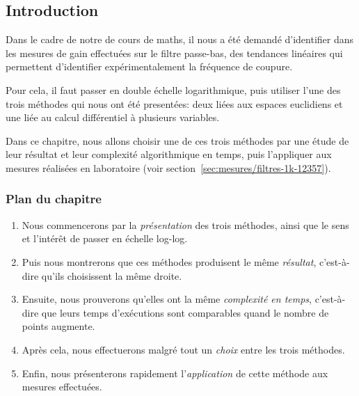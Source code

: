\subsection*{Introduction}

Dans le cadre de notre de cours de maths,
il nous a été demandé d'identifier dans les mesures de gain effectuées
sur le filtre passe-bas,
des tendances linéaires qui permettent d'identifier expérimentalement
la fréquence de coupure.

Pour cela, il faut passer en double échelle logarithmique,
puis utiliser l'une des trois méthodes qui nous ont été presentées:
deux liées aux espaces euclidiens et une liée au calcul différentiel
à plusieurs variables.

Dans ce chapitre, nous allons choisir une de ces trois méthodes
par une étude de leur résultat et leur complexité algorithmique en temps,
puis l'appliquer aux mesures réalisées en laboratoire
(voir section~\ref{sec:mesures/filtres-1k-12357}).

\subsubsection*{Plan du chapitre}
\begin{enumerate}
    \item Nous commencerons par la \emph{présentation} des trois méthodes,
        ainsi que le sens et l'intérêt de passer en échelle log-log.
    \item Puis nous montrerons que ces méthodes produisent
        le même \emph{résultat},
        c'est-à-dire qu'ils choisissent la même droite.
    \item Ensuite, nous prouverons qu'elles ont la même \emph{complexité
        en temps}, c'est-à-dire que leurs temps d'exécutions sont comparables
        quand le nombre de points augmente.
    \item Après cela, nous effectuerons malgré tout un \emph{choix}
        entre les trois méthodes.
    \item Enfin, nous présenterons rapidement l'\emph{application}
        de cette méthode aux mesures effectuées.
\end{enumerate}
